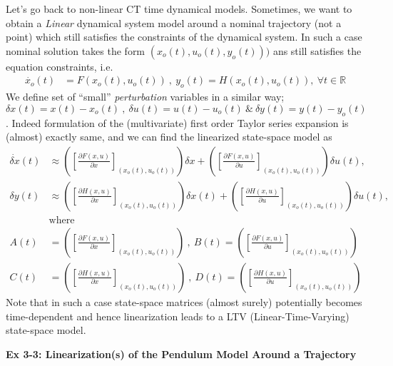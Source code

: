 \documentclass[twoside]{article}
\begin{document}
Let's go back to non-linear CT time dynamical models. Sometimes, 
we want to obtain a \textit{Linear} dynamical system model 
around a nominal trajectory (not a point) which still satisfies the
constraints of the dynamical system. In such a case nominal solution 
takes the form $(x_o(t),u_o(t),y_o(t)))$ ans still satisfies the equation constraints, i.e.
%
\begin{align*}
  \dot{x_o}(t) &= F(x_o(t),u_o(t)) \ , \  y_o(t) = H(x_o(t),u_o(t)) , \ \forall
                                        t \in \mathbb{R}
\end{align*}
%
We define set of ``small'' \textit{perturbation} variables in a
similar way; $\delta x(t)
= x(t) - x_o(t) \ , \ \delta u(t) = u(t) - u_o(t) \ \& \ \delta y(t) = y(t)
- y_o(t)$. Indeed formulation of the (multivariate) first order Taylor
series expansion is (almost) exactly same, and we can find the linearized state-space model as
%
\begin{align*}
  \dot{\delta x}(t) &\approx \left( \left[ \frac{\partial F(x,u)}{\partial x}
                      \right]_{(x_o(t),u_o(t))} \right) \delta x + \left( \left[ \frac{\partial F(x,u)}{\partial u}
                      \right]_{(x_o(t),u_o(t))} \right) \delta u(t)  , \\
  \delta y(t)  &\approx \left( \left[ \frac{\partial H(x,u)}{\partial x}
                      \right]_{(x_o(t),u_o(t))} \right) \delta x(t) + \left( \left[ \frac{\partial H(x,u)}{\partial u}
                      \right]_{(x_o(t),u_o(t))} \right) \delta u(t) , 
\\ 
&\mathrm{where}
\\
A(t) &= \left( \left[ \frac{\partial F(x,u)}{\partial x}
                      \right]_{(x_o(t),u_o(t))} \right) \ , \ B(t) = \left( \left[ \frac{\partial F(x,u)}{\partial u}
                      \right]_{(x_o(t),u_o(t))} \right)
\\
C(t) &= \left( \left[ \frac{\partial H(x,u)}{\partial x}
                      \right]_{(x_o(t),u_o(t))} \right) \ , \ D(t) = \left( \left[ \frac{\partial H(x,u)}{\partial u}
                      \right]_{(x_o(t),u_o(t))} \right)
\end{align*}
%
Note that in such a case state-space matrices (almost surely) potentially becomes
time-dependent and hence linearization leads to a LTV
(Linear-Time-Varying) state-space model. 

\vspace{12pt}

\textbf{Ex 3-3: Linearization(s) of the Pendulum Model Around a Trajectory}
\end{document}
